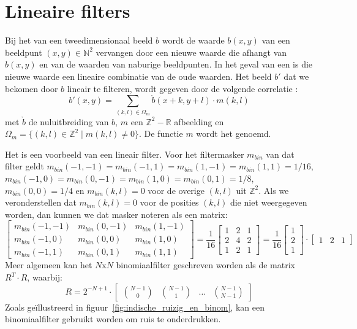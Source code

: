 \section{Lineaire filters}
\label{sectie:lineaire_filters}

Bij het  van een tweedimensionaal beeld $b$ wordt de waarde $b(x,y)$ van een 
beeldpunt $(x,y) \in \mathbb{N}^2$ vervangen door een nieuwe waarde die afhangt van $b(x,y)$ 
en van de waarden van naburige beeldpunten. In het geval van een  is die nieuwe waarde een lineaire combinatie 
van de oude waarden. Het beeld $b'$ dat we bekomen door $b$ lineair te filteren, wordt gegeven door
de volgende correlatie \cite{philips:beeldverwerking}:
\begin{displaymath}
b'(x,y) = \sum_{(k,l) \in \Omega_m} \mathring{b}(x+k,y+l) \cdot m(k,l)
\end{displaymath}
met $\mathring{b}$ de nuluitbreiding van $b$, $m$ een $\mathbb{Z}^2 - \mathbb{R}$ afbeelding 
en $\Omega_m = \{ (k,l) \in \mathbb{Z}^2 \mid m(k,l) \ne 0 \}$. 
De functie $m$ wordt het  genoemd.

Het  is een voorbeeld van een lineair filter. Voor het filtermasker 
$m_{bin}$ van dat filter geldt $m_{bin}(-1,-1)=m_{bin}(-1,1)=m_{bin}(1,-1)=m_{bin}(1,1)=1/16$, 
$m_{bin}(-1,0)=m_{bin}(0,-1)=m_{bin}(1,0)=m_{bin}(0,1)=1/8$, $m_{bin}(0,0)=1/4$ en 
$m_{bin}(k,l)=0$ voor de overige $(k,l)$ uit $\mathbb{Z}^2$. Als we veronderstellen dat $m_{bin}(k,l)=0$ voor de 
posities $(k,l)$ die niet weergegeven worden, dan kunnen we dat masker noteren als een matrix:
\begin{displaymath}
\left[ \begin{array}{ccc} m_{bin}(-1,-1) & m_{bin}(0,-1) & m_{bin}(1,-1)\\ m_{bin}(-1,0) & m_{bin}(0,0) & m_{bin}(1,0)\\ m_{bin}(-1,1) & m_{bin}(0,1) & m_{bin}(1,1) \end{array} \right]
= \frac{1}{16}\left[ \begin{array}{ccc} 1 & 2 & 1\\ 2 & 4 & 2\\ 1 & 2 & 1 \end{array} \right]
= \frac{1}{16}\left[ \begin{array}{c} 1\\ 2\\ 1 \end{array} \right] \cdot 
\left[ \begin{array}{ccc} 1 & 2 & 1 \end{array} \right]
\end{displaymath}
Meer algemeen kan het $N$x$N$ binomiaalfilter geschreven worden als de matrix $R^T \cdot R$,
waarbij: 
\begin{displaymath}
R=2^{-N+1} \cdot \left[ \begin{array}{cccc} \binom{N-1}{0} & \binom{N-1}{1} & 
\ldots & \binom{N-1}{N-1} \end{array} \right]
\end{displaymath}
Zoals ge\"illustreerd in figuur~\ref{fig:indische_ruizig_en_binom}, kan een binomiaalfilter 
gebruikt worden om ruis te onderdrukken.

